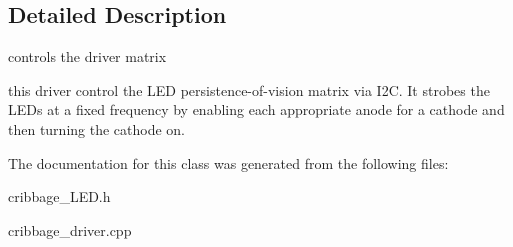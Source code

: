 \subsection{Detailed Description}
controls the driver matrix 

this driver control the L\+ED persistence-\/of-\/vision matrix via I2C. It strobes the L\+ED\textquotesingle{}s at a fixed frequency by enabling each appropriate anode for a cathode and then turning the cathode on. 

The documentation for this class was generated from the following files\+:\begin{DoxyCompactItemize}
\item 
cribbage\+\_\+\+L\+E\+D.\+h\item 
cribbage\+\_\+driver.\+cpp\end{DoxyCompactItemize}
